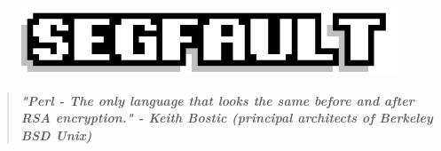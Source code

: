 \documentclass[9pt]{extarticle} %
\begin{document}

\pagestyle{fancy}
\fancyhf{}
\rhead{\today}
\addtolength\footskip{-15px}


\begin{figure}[H]
\centering\vspace{0.5cm}\includegraphics[width=0.8\linewidth]{imgs/segfault.png}
\end{figure}


\vspace{-15px}
\begin{quote}
\centering
\textbf{\textit{"Perl - The only language that looks the same before and after RSA encryption." - Keith Bostic (principal architects of Berkeley BSD Unix)}}
\end{quote}
\vspace{10px}

\end{document}
